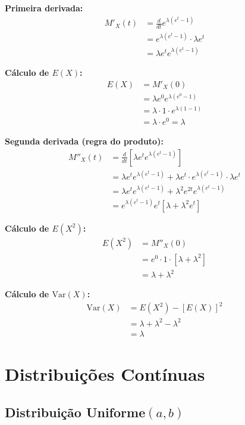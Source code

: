 \documentclass[12pt,a4paper]{article}
\theoremstyle{plain}
\theoremstyle{definition}
\theoremstyle{remark}
\begin{document}
\textbf{Primeira derivada:}
\begin{align}
M'_X(t) &= \frac{d}{dt} e^{\lambda(e^t - 1)} \\
&= e^{\lambda(e^t - 1)} \cdot \lambda e^t \\
&= \lambda e^t e^{\lambda(e^t - 1)}
\end{align}

\textbf{Cálculo de \(E(X)\):}
\begin{align}
E(X) &= M'_X(0) \\
&= \lambda e^0 e^{\lambda(e^0 - 1)} \\
&= \lambda \cdot 1 \cdot e^{\lambda(1-1)} \\
&= \lambda \cdot e^0 = \lambda
\end{align}

\textbf{Segunda derivada (regra do produto):}
\begin{align}
M''_X(t) &= \frac{d}{dt}[\lambda e^t e^{\lambda(e^t - 1)}] \\
&= \lambda e^t e^{\lambda(e^t - 1)} + \lambda e^t \cdot e^{\lambda(e^t - 1)} \cdot \lambda e^t \\
&= \lambda e^t e^{\lambda(e^t - 1)} + \lambda^2 e^{2t} e^{\lambda(e^t - 1)} \\
&= e^{\lambda(e^t - 1)} e^t [\lambda + \lambda^2 e^t]
\end{align}

\textbf{Cálculo de \(E(X^2)\):}
\begin{align}
E(X^2) &= M''_X(0) \\
&= e^0 \cdot 1 \cdot [\lambda + \lambda^2] \\
&= \lambda + \lambda^2
\end{align}

\textbf{Cálculo de \(\text{Var}(X)\):}
\begin{align}
\text{Var}(X) &= E(X^2) - [E(X)]^2 \\
&= \lambda + \lambda^2 - \lambda^2 \\
&= \lambda
\end{align}

\newpage
\section{Distribuições Contínuas}

\subsection{Distribuição Uniforme\((a, b)\)}
\end{document}
